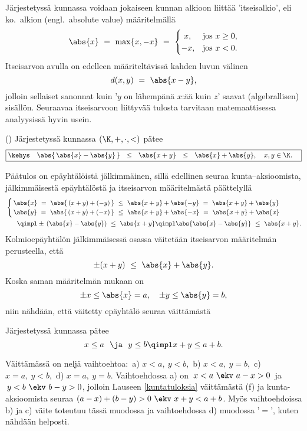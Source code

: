 Järjestetyssä kunnassa voidaan jokaiseen kunnan alkioon liittää 'itseisalkio', eli ko.\ alkion
%
 (engl.\ absolute value) määritelmällä
\[
\abs{x}\ =\ \max \{x,-x\}\ =\ \begin{cases}
                                 \ x,  &\text{jos $x \ge 0$,} \\
                                  -x,   &\text{jos $x < 0$.}
                              \end{cases}
\]       
Itseisarvon avulla on edelleen määriteltävissä kahden luvun välinen 
\[ d(x,y)\ =\ \abs{x-y}, \]
jolloin sellaiset sanonnat kuin '$y$ on lähempänä $x$:ää kuin $z$' saavat (algebrallisen) 
sisällön. Seuraavaa itseisarvoon liittyvää tulosta tarvitaan matemaattisessa analyysissä hyvin
usein.
\begin{Lause} \label{kolmioepäyhtälö} ()
 Järjestetyssä kunnassa $(\K,+,\cdot,<)$ pätee
\[
\boxed{\kehys \quad \abs{\,\abs{x} - \abs{y}\,}\ \ 
             \le\ \ \abs{x+y}\ \ \le\ \ \abs{x} + \abs{y}, \quad x,y \in \K. \quad}
\] 
\end{Lause}
\tod Päätulos on epäyhtälöistä jälkimmäinen, sillä edellinen seuraa kunta--aksioomista,
jälkimmäisestä epäyhtälöstä ja itseisarvon määritelmästä päättelyllä
\begin{align*}
&\begin{cases}
 \,\abs{x}\ =\ \abs{\,(x+y) + (-y)\,}\ \le\ \abs{x+y} + \abs{-y}\ =\ \abs{x+y} + \abs{y} \\
 \,\abs{y}\ =\ \abs{\,(x+y) + (-x)\,}\ \le\ \abs{x+y} + \abs{-x}\ =\ \abs{x+y} + \abs{x}
\end{cases} \\
& \quad\ \ \qimpl \pm\,(\abs{x}-\abs{y})\ \le\ \abs{x+y}
           \qimpl  \abs{\abs{x}-\abs{y}}\ \le\ \abs{x+y}.
\end{align*}
Kolmioepäyhtälön jälkimmäisessä osassa väitetään itseisarvon määritelmän perusteella, että
\[
\pm(x+y)\ \le\ \abs{x} + \abs{y}.
\]
Koska saman määritelmän mukaan on
\[
\pm x \le \abs{x} = a, \quad \pm y \le \abs{y} =b,
\]
niin nähdään, että väitetty epäyhtälö seuraa väittämästä
\begin{Lem} Järjestetyssä kunnassa pätee 
\[  
x \le a\ \ \ja\ \ y \le b \qimpl x+y \le a+b. 
\] 
\end{Lem}
\tod Väittämässä on neljä vaihtoehtoa:\ a) $x<a,\ y<b$,\ b) $x<a,\ y=b$,\ c) $x=a,\ y<b$,\ 
d) $x=a,\ y=b$. Vaihtoehdossa a) on $\,x<a\ \ekv\ a-x>0\,$ ja $\,y<b\ \ekv\ b-y>0$, jolloin
Lauseen \ref{kuntatuloksia} väittämästä (f) ja kunta-aksioomista seuraa
$(a-x)+(b-y)>0\ \ekv\ x+y<a+b$. Myös vaihtoehdoissa b) ja c) väite toteutuu tässä muodossa ja
vaihtoehdossa d) muodossa '$=$', kuten nähdään helposti. \loppu

